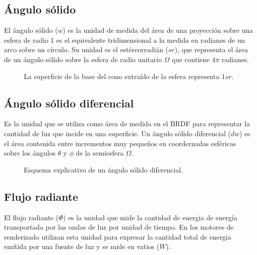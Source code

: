     \subsection*{\'Angulo s\'olido}
    El \'angulo s\'olido ($w$) es la unidad de medida del \'area de una proyecci\'on sobre una esfera de radio 1  es el
    equivalente tridimensional a la medida en radianes de un arco sobre un c\'irculo. Su unidad es el est\'ereorradi\'an
    ($sr$), que representa el \'area de un \'angulo s\'olido sobre la esfera de radio unitario $\Omega$ que contiene $4\pi$ radianes.

    \begin{figure}[H]
        \vspace{0.5cm}
        \centering
        \caption{La superficie de la base del cono extra\'ido de la esfera representa 1$sr$.}
        \vspace{0.5cm}
    \end{figure}

    \subsection*{\'Angulo s\'olido diferencial}
    Es la unidad que se utiliza como \'area de medida en el BRDF para representar la cantidad de luz que incide en una superficie.
    Un \'angulo s\'olido diferencial ($dw$) es el \'area contenida entre incrementos muy peque\~nos en coordernadas esf\'ericas sobre
    los \'angulos $\theta$ y $\phi$ de la semiesfera $\Omega$.

    \begin{figure}[H]
        \vspace{0.5cm}
        \centering
        \caption{Esquema explicativo de un \'angulo s\'olido diferencial.}
        \vspace{0.5cm}
    \end{figure}


    \subsection*{Flujo radiante}
        El flujo radiante ($\Phi$) es la unidad que mide la  cantidad de energia de energ\'ia transportada
        por las ondas de luz por unidad de tiempo. En los motores de renderizado utilizan esta unidad para expresar la cantidad
        total de energia emitida por una fuente de luz y se mide en vatios ($W$).

